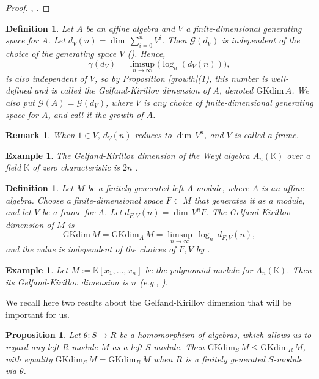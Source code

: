\documentclass[12pt, a4paper]{amsart}
\newtheorem{proposition}[theorem]{Proposition}
\newtheorem{definition}[theorem]{Definition}
\newtheorem{remark}[theorem]{Remark}
\newtheorem{example}[theorem]{Example}
\newcommand{\Weyl}{A_n(\mathbb{K})} %
\newcommand{\GKdim}{\text{GKdim}}    %
\def\k{\mathbb K}
\def\k{\mathbb K}
\begin{document}
\begin{proof}
    \cite[Lemma 2.1b)]{KL}, \cite[Lemma 8.1.7]{McConnell}.
\end{proof}
\begin{definition}
Let $A$ be an affine algebra and $V$ a finite-dimensional generating space for $A$. Let $d_V(n)=\dim \, \sum_{i=0}^n V^i$. Then $\mathcal{G}(d_V)$ is independent of the choice of the generating space $V$ (\cite[Lemma 1.1]{KL}). Hence,
\[ \gamma(d_V)=\limsup_{n \rightarrow \infty} \big(\log_n(d_V(n))\big),\]
is also independent of $V$, so by Proposition \ref{growth}(1), this number is well-defined and is called the \emph{Gelfand-Kirillov dimension} of $A$, denoted $\GKdim \, A$. We also put $\mathcal{G}(A)=\mathcal{G}(d_V)$, where $V$ is any choice of finite-dimensional generating space for $A$, and call it \emph{the growth of} $A$.
\end{definition}
\begin{remark}
When $1 \in V$, $d_V(n)$ reduces to $\dim \, V^n$, and $V$ is called a frame.
\end{remark}
\begin{example}
The Gelfand-Kirillov dimension of the Weyl algebra $\Weyl$ over a field $\k$ of zero characteristic is $2n$ \cite[Proposition 8.1.15(ii)]{McConnell}.
\end{example}
\begin{definition}
    Let $M$ be a finitely generated left $A$-module, where $A$ is an affine algebra. Choose a finite-dimensional space $F \subset M$ that generates it as a module, and let $V$ be a frame for $A$. Let $d_{F,V}(n)=\dim \, V^n F$. The \emph{Gelfand-Kirillov dimension} of $M$ is
    \[ \GKdim \, M=\GKdim_A\, M=\limsup_{n \to \infty} \, \log_n \, d_{F,V}(n), \]
    and the value is independent of the choices of $F, V$ by \cite[Proof of Lemma 1.1]{KL}.
\end{definition}
\begin{example}
Let $M:=\k[x_1,\ldots,x_n]$ be the polynomial module for $\Weyl$. Then its Gelfand-Kirillov dimension is $n$ (e.g., \cite[Theorem 8.5.10]{McConnell}).
\end{example}
We recall here two results about the Gelfand-Kirillov dimension that will be important for us.
\begin{proposition}\label{basic-GK-1}
    Let $\theta: S \rightarrow R$ be a homomorphism of algebras, which allows us to regard any left $R$-module $M$ as a left $S$-module. Then $\GKdim_S \, M \leq \GKdim_R \,  M$, with equality $\GKdim_S \, M = \GKdim_R \,  M$ when $R$ is a finitely generated $S$-module via $\theta$. \end{proposition}
\end{document}
